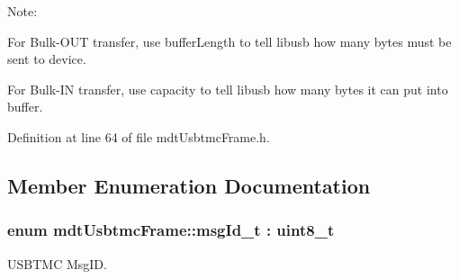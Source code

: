 Note\-:
\begin{DoxyItemize}
\item For Bulk-\/\-O\-U\-T transfer, use buffer\-Length to tell libusb how many bytes must be sent to device.
\item For Bulk-\/\-I\-N transfer, use capacity to tell libusb how many bytes it can put into buffer. 
\end{DoxyItemize}

Definition at line 64 of file mdt\-Usbtmc\-Frame.\-h.



\subsection{Member Enumeration Documentation}
\hypertarget{classmdt_usbtmc_frame_abf1e449c264011341c477d45eb700c42}{
\subsubsection[{msg\-Id\-\_\-t}]{\setlength{\rightskip}{0pt plus 5cm}enum {\bf mdt\-Usbtmc\-Frame\-::msg\-Id\-\_\-t} \-: uint8\-\_\-t\hspace{0.3cm}{\ttfamily [strong]}}}\label{classmdt_usbtmc_frame_abf1e449c264011341c477d45eb700c42}


U\-S\-B\-T\-M\-C Msg\-I\-D. 

